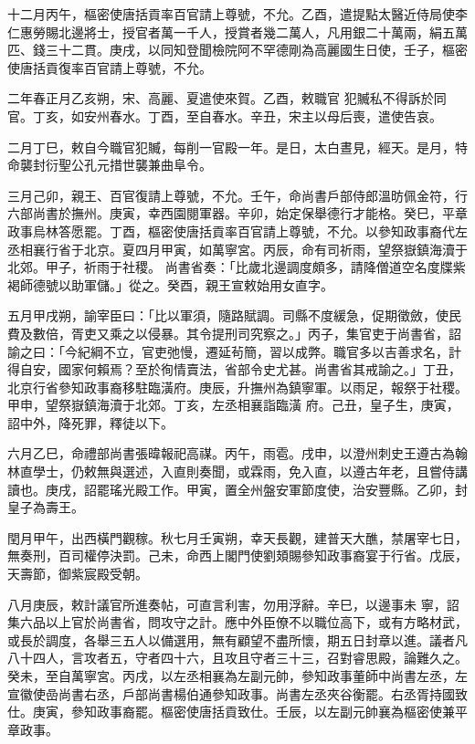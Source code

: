 \begin{pinyinscope}
 十二月丙午，樞密使唐括貢率百官請上尊號，不允。乙酉，遣提點太醫近侍局使李仁惠勞賜北邊將士，授官者萬一千人，授賞者幾二萬人，凡用銀二十萬兩，絹五萬匹、錢三十二貫。庚戌，以同知登聞檢院阿不罕德剛為高麗國生日使，壬子，樞密使唐括貢復率百官請上尊號，不允。



 二年春正月乙亥朔，宋、高麗、夏遣使來賀。乙酉，敕職官
 犯贓私不得訴於同官。丁亥，如安州春水。丁酉，至自春水。辛丑，宋主以母后喪，遣使告哀。



 二月丁巳，敕自今職官犯贓，每削一官殿一年。是日，太白晝見，經天。是月，特命襲封衍聖公孔元措世襲兼曲阜令。



 三月己卯，親王、百官復請上尊號，不允。壬午，命尚書戶部侍郎溫昉佩金符，行六部尚書於撫州。庚寅，幸西園閱軍器。辛卯，始定保舉德行才能格。癸巳，平章政事烏林答愿罷。丁酉，樞密使唐括貢率百官請上尊號，不允。以參知政事裔代左丞相襄行省于北京。夏四月甲寅，如萬寧宮。丙辰，命有司祈雨，望祭嶽鎮海瀆于北郊。甲子，祈雨于社稷。
 尚書省奏：「比歲北邊調度頗多，請降僧道空名度牒紫褐師德號以助軍儲。」從之。癸酉，親王宣敕始用女直字。



 五月甲戌朔，諭宰臣曰：「比以軍須，隨路賦調。司縣不度緩急，促期徵斂，使民費及數倍，胥吏又乘之以侵暴。其令提刑司究察之。」丙子，集官吏于尚書省，詔諭之曰：「今紀綱不立，官吏弛慢，遷延茍簡，習以成弊。職官多以吉善求名，計得自安，國家何賴焉？至於徇情賣法，省部令史尤甚。尚書省其戒諭之。」丁丑，北京行省參知政事裔移駐臨潢府。庚辰，升撫州為鎮寧軍。以雨足，報祭于社稷。甲申，望祭嶽鎮海瀆于北郊。丁亥，左丞相襄詣臨潢
 府。己丑，皇子生，庚寅，詔中外，降死罪，釋徒以下。



 六月乙巳，命禮部尚書張暐報祀高禖。丙午，雨雹。戌申，以澄州刺史王遵古為翰林直學士，仍敕無與選述，入直則奏聞，或霖雨，免入直，以遵古年老，且嘗侍講讀也。庚戌，詔罷瑤光殿工作。甲寅，置全州盤安軍節度使，治安豐縣。乙卯，封皇子為壽王。



 閏月甲午，出西橫門觀稼。秋七月壬寅朔，幸天長觀，建普天大醮，禁屠宰七日，無奏刑，百司權停決罰。己未，命西上閣門使劉頍賜參知政事裔宴于行省。戊辰，天壽節，御紫宸殿受朝。



 八月庚辰，敕計議官所進奏帖，可直言利害，勿用浮辭。辛巳，以邊事未
 寧，詔集六品以上官於尚書省，問攻守之計。應中外臣僚不以職位高下，或有方略材武，或長於調度，各舉三五人以備選用，無有顧望不盡所懷，期五日封章以進。議者凡八十四人，言攻者五，守者四十六，且攻且守者三十三，召對睿思殿，論難久之。癸未，至自萬寧宮。丙戌，以左丞相襄為左副元帥，參知政事董師中尚書左丞，左宣徽使嵒尚書右丞，戶部尚書楊伯通參知政事。尚書左丞夾谷衡罷。右丞胥持國致仕。庚寅，參知政事裔罷。樞密使唐括貢致仕。壬辰，以左副元帥襄為樞密使兼平章政事。




\end{pinyinscope}
